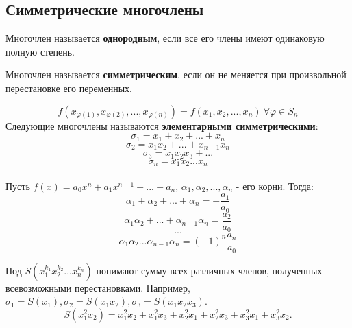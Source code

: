 \documentclass[12pt]{article}
\begin{document}
\subsection{Симметрические многочлены}
\begin{defn}
Многочлен называется \textbf{однородным}, если все его члены имеют одинаковую полную степень.
\end{defn}
\begin{defn}
Многочлен называется \textbf{симметрическим}, если он не меняется при произвольной перестановке его переменных.
\end{defn}
$$f(x_{\varphi(1)}, x_{\varphi(2)}, ..., x_{\varphi(n)}) = f(x_1, x_2, ..., x_n)~ \forall \varphi \in S_n$$
\indent Следующие многочлены называются \textbf{элементарными симметрическими}:
$$\sigma_1 = x_1 + x_2 + ... + x_n$$
$$\sigma_2 = x_1x_2 + ... + x_{n-1}x_n$$
$$\sigma_3 = x_1x_2x_3 + ...$$
$$...$$
$$\sigma_n = x_1x_2...x_n$$
\\
\indent Пусть $f(x) = a_0x^n + a_1x^{n-1} + ... + a_n$, $\alpha_1, \alpha_2, ..., \alpha_n$ - его корни. Тогда:
$$\alpha_1 + \alpha_2 + ... + \alpha_n = -\frac{a_1}{a_0}$$
$$\alpha_1\alpha_2 + ... + \alpha_{n-1}\alpha_n = \frac{a_2}{a_0}$$
$$...$$
$$\alpha_1\alpha_2...\alpha_{n-1}\alpha_n = (-1)^n\frac{a_n}{a_0}$$

\indent Под $S(x_1^{k_1}x_2^{k_2}...x_n^{k_n})$ понимают сумму всех различных членов, полученных всевозможными перестановками. Например, $\sigma_1 = S(x_1), \sigma_2 = S(x_1x_2), \sigma_3 = S(x_1x_2x_3)$.
$$S(x_1^2x_2) = x_1^2x_2 + x_1^2x_3 + x_2^2x_1 + x_2^2x_3 + x_3^2x_1 + x_3^2x_2.$$
\end{document}

